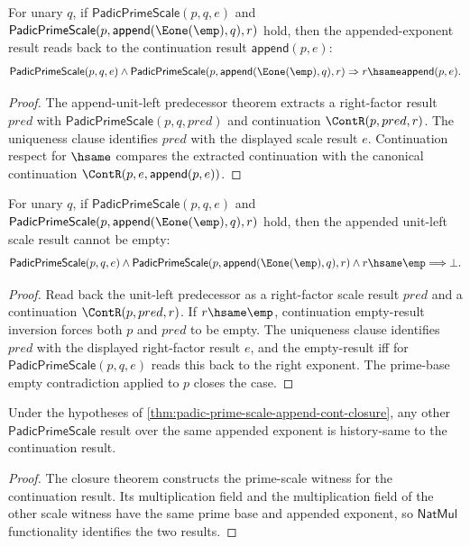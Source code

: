 \begin{theorem}
\label{thm:padic-prime-scale-append-unit-left-result-hsame}
For unary $q$, if $\mathsf{PadicPrimeScale}(p,q,e)$ and
$\mathsf{PadicPrimeScale}(p,\mathsf{append}(\Eone(\emp),q),r)$ hold, then the
appended-exponent result reads back to the continuation result
$\mathsf{append}(p,e)$:
$$
\mathsf{PadicPrimeScale}(p,q,e)\land
\mathsf{PadicPrimeScale}(p,\mathsf{append}(\Eone(\emp),q),r)
\Rightarrow
r\hsame\mathsf{append}(p,e).
$$
\end{theorem}
\begin{proof}
The append-unit-left predecessor theorem extracts a right-factor result
$pred$ with $\mathsf{PadicPrimeScale}(p,q,pred)$ and continuation
$\ContR(p,pred,r)$. The uniqueness clause identifies $pred$ with the displayed
scale result $e$. Continuation respect for $\hsame$ compares the extracted
continuation with the canonical continuation
$\ContR(p,e,\mathsf{append}(p,e))$.
\end{proof}

\begin{theorem}
\label{thm:padic-prime-scale-append-unit-left-result-not-empty}
For unary $q$, if $\mathsf{PadicPrimeScale}(p,q,e)$ and
$\mathsf{PadicPrimeScale}(p,\mathsf{append}(\Eone(\emp),q),r)$ hold, then the
appended unit-left scale result cannot be empty:
$$
\mathsf{PadicPrimeScale}(p,q,e)\land
\mathsf{PadicPrimeScale}(p,\mathsf{append}(\Eone(\emp),q),r)\land
r\hsame\emp
\Longrightarrow \bot.
$$
\end{theorem}
\begin{proof}
Read back the unit-left predecessor as a right-factor scale result $pred$ and
a continuation $\ContR(p,pred,r)$. If $r\hsame\emp$, continuation empty-result
inversion forces both $p$ and $pred$ to be empty. The uniqueness clause
identifies $pred$ with the displayed right-factor result $e$, and the
empty-result iff for $\mathsf{PadicPrimeScale}(p,q,e)$ reads this back to the
right exponent. The prime-base empty contradiction applied to $p$ closes the
case.
\end{proof}

\begin{lemma}
\label{lem:padic-prime-scale-append-cont-result-functional}
Under the hypotheses of
\autoref{thm:padic-prime-scale-append-cont-closure}, any other
\(\mathsf{PadicPrimeScale}\) result over the same appended exponent is
history-same to the continuation result.
\end{lemma}
\begin{proof}
The closure theorem constructs the prime-scale witness for the continuation
result. Its multiplication field and the multiplication field of the other
scale witness have the same prime base and appended exponent, so
\(\mathsf{NatMul}\) functionality identifies the two results.
\end{proof}

